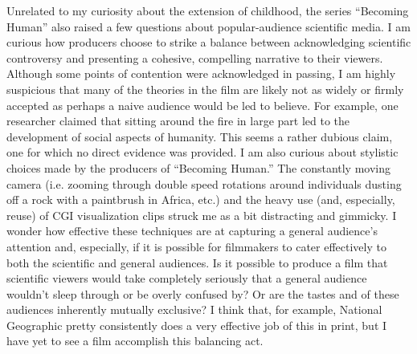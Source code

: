 Unrelated to my curiosity about the extension of childhood, the series ``Becoming Human'' also raised a few questions about popular-audience scientific media.
I am curious how producers choose to strike a balance between acknowledging scientific controversy and presenting a cohesive, compelling narrative to their viewers.
Although some points of contention were acknowledged in passing, I am highly suspicious that many of the theories in the film are likely not as widely or firmly accepted as perhaps a naive audience would be led to believe.
For example, one researcher claimed that sitting around the fire in large part led to the development of social aspects of humanity.
This seems a rather dubious claim, one for which no direct evidence was provided.
I am also curious about stylistic choices made by the producers of ``Becoming Human.''
The constantly moving camera (i.e. zooming through double speed rotations around individuals dusting off a rock with a paintbrush in Africa, etc.) and the heavy use (and, especially, reuse) of CGI visualization clips struck me as a bit distracting and gimmicky.
I wonder how effective these techniques are at capturing a general audience's attention and, especially, if it is possible for filmmakers to cater effectively to both the scientific and general audiences. Is it possible to produce a film that scientific viewers would take completely seriously that a general audience wouldn't sleep through or be overly confused by? Or are the tastes and of these audiences inherently mutually exclusive? I think that, for example, National Geographic pretty consistently does a very effective job of this in print, but I have yet to see a film accomplish this balancing act.